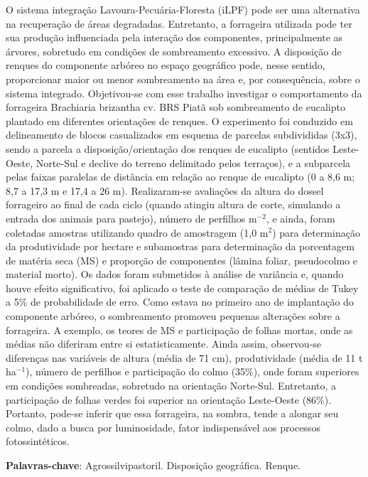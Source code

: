 \documentclass[article,12pt,onesidea,4paper,english,brazil]{abntex2}
\begin{document}
	\noindent O sistema integração Lavoura-Pecuária-Floresta (iLPF) pode ser uma alternativa na
	recuperação de áreas degradadas. Entretanto, a forrageira utilizada pode ter sua
	produção influenciada pela interação dos componentes, principalmente as árvores,
	sobretudo em condições de sombreamento excessivo. A disposição de renques do
	componente arbóreo no espaço geográfico pode, nesse sentido, proporcionar maior
	ou menor sombreamento na área e, por consequência, sobre o sistema integrado.
	Objetivou-se com esse trabalho investigar o comportamento da forrageira Brachiaria
	brizantha cv. BRS Piatã sob sombreamento de eucalipto plantado em diferentes
	orientações de renques. O experimento foi conduzido em delineamento de blocos
	casualizados em esquema de parcelas subdivididas (3x3), sendo a parcela a
	disposição/orientação dos renques de eucalipto (sentidos Leste-Oeste, Norte-Sul e
	declive do terreno delimitado pelos terraços), e a subparcela pelas faixas paralelas
	de distância em relação ao renque de eucalipto (0 a 8,6 m; 8,7 a 17,3 m e 17,4 a 26
	m). Realizaram-se avaliações da altura do dossel forrageiro ao final de cada ciclo
	(quando atingiu altura de corte, simulando a entrada dos animais para pastejo),
	número de perfilhos m$^{-2}$, e ainda, foram coletadas amostras utilizando quadro de
	amostragem (1,0 m$^{2}$) para determinação da produtividade por hectare e
	subamostras para determinação da porcentagem de matéria seca (MS) e proporção
	de componentes (lâmina foliar, pseudocolmo e material morto). Os dados foram
	submetidos à análise de variância e, quando houve efeito significativo, foi aplicado o
	teste de comparação de médias de Tukey a 5\% de probabilidade de erro. Como
	estava no primeiro ano de implantação do componente arbóreo, o sombreamento
	promoveu pequenas alterações sobre a forrageira. A exemplo, os teores de MS e
	participação de folhas mortas, onde as médias não diferiram entre si
	estatisticamente. Ainda assim, observou-se diferenças nas variáveis de altura
	(média de 71 cm), produtividade (média de 11 t ha$^{-1}$), número de perfilhos e participação do colmo (35\%), onde foram superiores em condições sombreadas, sobretudo na orientação Norte-Sul. Entretanto, a participação de folhas verdes foi
	superior na orientação Leste-Oeste (86\%). Portanto, pode-se inferir que essa
	forrageira, na sombra, tende a alongar seu colmo, dado a busca por luminosidade,
	fator indispensável aos processos fotossintéticos.
	
	\vspace{\onelineskip}
	
	\noindent
	\textbf{Palavras-chave}: Agrossilvipastoril. Disposição geográfica. Renque.
	
\end{document}

